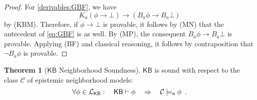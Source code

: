 \documentclass[12pt]{article}
\theoremstyle{definition}
\newtheorem{theorem}{Theorem}[section]
\newcommand{\Lang}{{\cal L}}   %
\newcommand{\KB}{{\mathsf{KB}}}                        %
\newcommand{\modelsn}{\models_{\mathsf{n}}}                  %
\begin{document}
\begin{proof}
  For \ref{derivables:GBF}, we have
  \begin{equation}
    K_a(\phi\to\bot)\to(B_a\phi\to B_a\bot)
    \label{eq:GBF}
  \end{equation}
  by (KBM).  Therefore, if $\phi\to\bot$ is provable, it follows by
  (MN) that the antecedent of \eqref{eq:GBF} is as well.  By (MP), the
  consequent $B_a\phi\to B_a\bot$ is provable.  Applying (BF) and
  classical reasoning, it follows by contraposition that $\lnot
  B_a\phi$ is provable.
\end{proof}

\begin{theorem}[$\KB$ Neighborhood Soundness]
  \label{theorem:KB-neighborhood-soundness}
  $\KB$ is sound with respect to the class $\mathcal{C}$ of
  epistemic neighborhood models:
  \[
  \forall\phi\in\Lang_\KB:\quad\KB\vdash\phi
  \quad\Rightarrow\quad
  \mathcal{C}\modelsn\phi
  \enspace.
  \]
\end{theorem}
\end{document}
